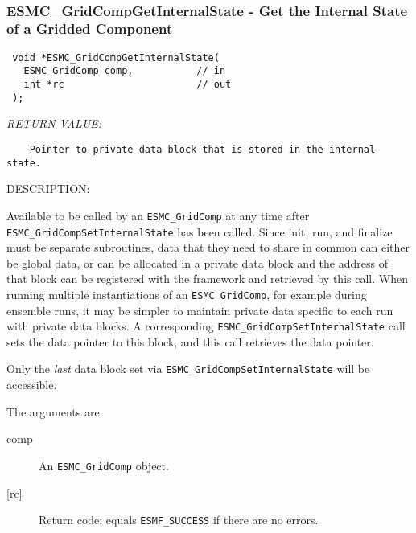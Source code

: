  
\mbox{}\hrulefill\ 
 
\subsubsection [ESMC\_GridCompGetInternalState] {ESMC\_GridCompGetInternalState - Get the Internal State of a Gridded Component}


  
\begin{verbatim} void *ESMC_GridCompGetInternalState(
   ESMC_GridComp comp,           // in
   int *rc                       // out
 );\end{verbatim}{\em RETURN VALUE:}
\begin{verbatim}    Pointer to private data block that is stored in the internal state.\end{verbatim}
{\sf DESCRIPTION:\\ }


  
    Available to be called by an {\tt ESMC\_GridComp} at any time after 
    {\tt ESMC\_GridCompSetInternalState} has been called. Since init, run, and
    finalize must be separate subroutines, data that they need to share in 
    common can either be global data, or can be allocated in a private data
    block and the address of that block can be registered with the framework 
    and retrieved by this call. When running multiple instantiations of an 
    {\tt ESMC\_GridComp}, for example during ensemble runs, it may be simpler 
    to maintain private data specific to each run with private data blocks. A 
    corresponding {\tt ESMC\_GridCompSetInternalState} call sets the data
    pointer to this block, and this call retrieves the data pointer. 
  
    Only the {\em last} data block set via {\tt ESMC\_GridCompSetInternalState}
    will be accessible. 
  
    The arguments are:
    \begin{description}
    \item[comp]
      An {\tt ESMC\_GridComp} object.
    \item[{[rc]}]
      Return code; equals {\tt ESMF\_SUCCESS} if there are no errors.
   \end{description}
   
 
